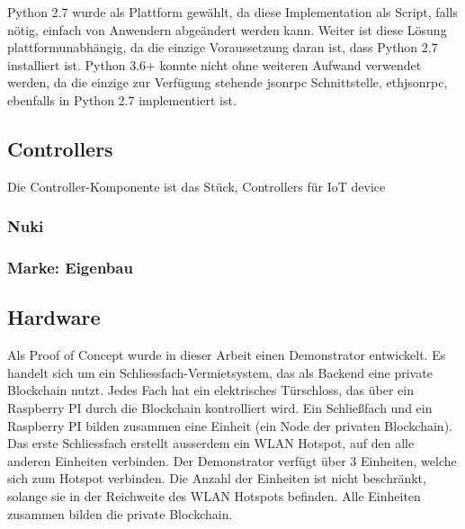 Python 2.7 wurde als Plattform gewählt, da diese Implementation als Script, falls nötig, einfach von Anwendern abgeändert werden kann. Weiter ist diese Lösung plattformunabhängig, da die einzige Voraussetzung daran ist, dass Python 2.7 installiert ist. Python 3.6+ konnte nicht ohne weiteren Aufwand verwendet werden, da die einzige zur Verfügung stehende jsonrpc Schnittstelle, ethjsonrpc, ebenfalls in Python 2.7 implementiert ist.

\subsection{Controllers}
Die Controller-Komponente ist das Stück,
Controllers für IoT device
\subsubsection{Nuki}

\subsubsection{Marke: Eigenbau}

\subsection{Hardware}
Als Proof of Concept wurde in dieser Arbeit einen Demonstrator entwickelt. Es handelt sich um ein Schliessfach-Vermietsystem, das als Backend eine private Blockchain nutzt. Jedes Fach hat ein elektrisches Türschloss, das über ein Raspberry PI durch die Blockchain kontrolliert wird. Ein Schließfach und ein Raspberry PI bilden zusammen eine Einheit (ein Node der privaten Blockchain). Das erste Schliessfach erstellt ausserdem ein WLAN Hotspot, auf den alle anderen Einheiten verbinden. Der Demonstrator verfügt über 3 Einheiten, welche sich zum Hotspot verbinden. Die Anzahl der Einheiten ist nicht beschränkt, solange sie in der Reichweite des WLAN Hotspots befinden. Alle Einheiten zusammen bilden die private Blockchain.
